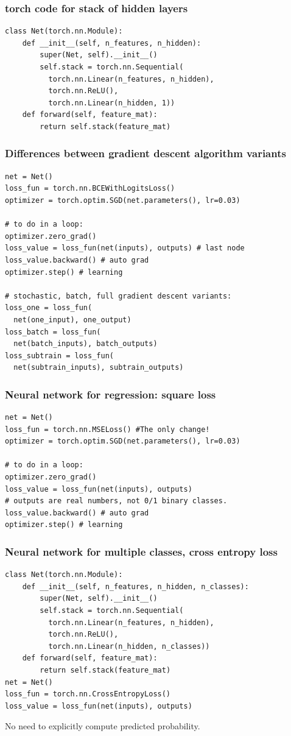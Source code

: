 \documentclass{beamer}
\begin{document}
\begin{frame}[fragile]
  \frametitle{torch code for stack of hidden layers}
\begin{verbatim}
class Net(torch.nn.Module):
    def __init__(self, n_features, n_hidden):
        super(Net, self).__init__()
        self.stack = torch.nn.Sequential(
          torch.nn.Linear(n_features, n_hidden),
          torch.nn.ReLU(),
          torch.nn.Linear(n_hidden, 1))
    def forward(self, feature_mat):
        return self.stack(feature_mat)
\end{verbatim}
\end{frame}

\begin{frame}[fragile]
  \frametitle{Differences between gradient descent algorithm variants}

\begin{verbatim}
net = Net()
loss_fun = torch.nn.BCEWithLogitsLoss()
optimizer = torch.optim.SGD(net.parameters(), lr=0.03)

# to do in a loop:
optimizer.zero_grad()
loss_value = loss_fun(net(inputs), outputs) # last node
loss_value.backward() # auto grad
optimizer.step() # learning

# stochastic, batch, full gradient descent variants:
loss_one = loss_fun(
  net(one_input), one_output)
loss_batch = loss_fun(
  net(batch_inputs), batch_outputs)
loss_subtrain = loss_fun(
  net(subtrain_inputs), subtrain_outputs)
\end{verbatim}

\end{frame}


\begin{frame}[fragile]
  \frametitle{Neural network for regression: square loss}

\begin{verbatim}
net = Net()
loss_fun = torch.nn.MSELoss() #The only change!
optimizer = torch.optim.SGD(net.parameters(), lr=0.03)

# to do in a loop:
optimizer.zero_grad()
loss_value = loss_fun(net(inputs), outputs) 
# outputs are real numbers, not 0/1 binary classes.
loss_value.backward() # auto grad
optimizer.step() # learning
\end{verbatim}

\end{frame}

\begin{frame}[fragile]
  \frametitle{Neural network for multiple classes, cross entropy loss}
\begin{verbatim}
class Net(torch.nn.Module):
    def __init__(self, n_features, n_hidden, n_classes):
        super(Net, self).__init__()
        self.stack = torch.nn.Sequential(
          torch.nn.Linear(n_features, n_hidden),
          torch.nn.ReLU(),
          torch.nn.Linear(n_hidden, n_classes))
    def forward(self, feature_mat):
        return self.stack(feature_mat)
net = Net()
loss_fun = torch.nn.CrossEntropyLoss()
loss_value = loss_fun(net(inputs), outputs)
\end{verbatim}
  No need to explicitly compute predicted probability.
\end{frame}
\end{document}
